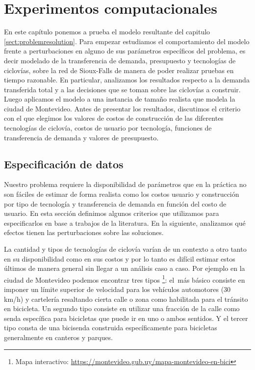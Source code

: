 \chapter{Experimentos computacionales}
\label{sect:problemresults}

En este capítulo ponemos a prueba el modelo resultante del capitulo \ref{sect:problemresolution}. Para empezar estudiamos el comportamiento del modelo frente a perturbaciones en alguno de sus parámetros específicos del problema, es decir modelado de la transferencia de demanda, presupuesto y tecnologías de ciclovías, sobre la red de Sioux-Falls de manera de poder realizar pruebas en tiempo razonable. En particular, analizamos los resultados respecto a la demanda transferida total y a las decisiones que se toman sobre las ciclovías a construir. Luego aplicamos el modelo a una instancia de tamaño realista que modela la ciudad de Montevideo. Antes de presentar los resultados, discutimos el criterio con el que elegimos los valores de costos de construcción de las diferentes tecnologías de ciclovía, costos de usuario por tecnología, funciones de transferencia de demanda y valores de presupuesto.

\section{Especificación de datos}
\label{sect:dataspecification}

Nuestro problema requiere la disponibilidad de parámetros que en la práctica no son fáciles de estimar de forma realista como los costos usuario y construcción por tipo de tecnología y transferencia de demanda en función del costo de usuario. En esta sección definimos algunos criterios que utilizamos para especificarlos en base a trabajos de la literatura. En la siguiente, analizamos qué efectos tienen las perturbaciones sobre las soluciones.

La cantidad y tipos de tecnologías de ciclovía varían de un contexto a otro tanto en su disponibilidad como en sus costos y por lo tanto es difícil estimar estos últimos de manera general sin llegar a un análisis caso a caso. Por ejemplo en la ciudad de Montevideo podemos encontrar tres tipos \footnote{Mapa interactivo: \url{https://montevideo.gub.uy/mapa-montevideo-en-bici}}: el más básico consiste en imponer un límite superior de velocidad para los vehículos automotores (30 km/h) y cartelería resaltando cierta calle o zona como habilitada para el tránsito en bicicleta. Un segundo tipo consiste en utilizar una fracción de la calle como senda específica para bicicletas que puede ir en uno o ambos sentidos. Y el tercer tipo consta de una bicisenda construida específicamente para bicicletas generalmente en canteros y parques.

